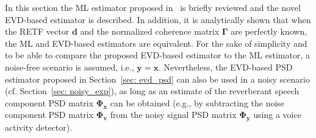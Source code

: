 \documentclass[10pt]{IEEEtran}
\begin{document}
In this section the ML estimator proposed in~\cite{Kuklasinski_EUSIPCO_2014g} is briefly reviewed and the novel EVD-based estimator is described.
In addition, it is analytically shown that when the RETF vector $\mathbf{d}$ and the normalized coherence matrix $\boldsymbol{\Gamma}$ are perfectly known, the ML and EVD-based estimators are equivalent.
For the sake of simplicity and to be able to compare the proposed EVD-based estimator to the ML estimator, a noise-free scenario is assumed, i.e., $\mathbf{y} = \mathbf{x}$.
Nevertheless, the EVD-based PSD estimator proposed in Section~\ref{sec: evd_psd} can also be used in a noisy scenario (cf. Section~\ref{sec: noisy_exp}), as long as an estimate of the reverberant speech component PSD matrix $\mathbf{\Phi}_{\mathbf{x}}$ can be obtained (e.g., by subtracting the noise component PSD matrix $\mathbf{\Phi}_{\mathbf{v}}$ from the noisy signal PSD matrix $\mathbf{\Phi}_{\mathbf{y}}$ using a voice activity detector). 
\end{document}
